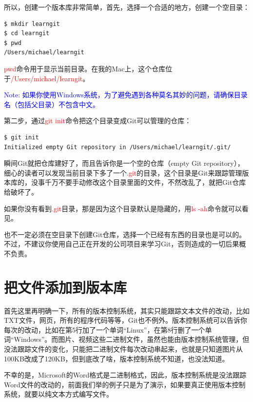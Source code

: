 所以，创建一个版本库非常简单，首先，选择一个合适的地方，创建一个空目录：

\begin{verbatim}
$ mkdir learngit
$ cd learngit
$ pwd
/Users/michael/learngit
\end{verbatim}

\textcolor{red}{pwd}命令用于显示当前目录。在我的Mac上，这个仓库位于\textcolor{red}{/Users/michael/learngit}。

\textcolor{blue}{Note: 如果你使用Windows系统，为了避免遇到各种莫名其妙的问题，请确保目录名（包括父目录）不包含中文。}

第二步，通过\textcolor{red}{git init}命令把这个目录变成Git可以管理的仓库：

\begin{verbatim}
$ git init
Initialized empty Git repository in /Users/michael/learngit/.git/
\end{verbatim}

瞬间Git就把仓库建好了，而且告诉你是一个空的仓库（empty Git repository），细心的读者可以发现当前目录下多了一个\textcolor{red}{.git}的目录，这个目录是Git来跟踪管理版本库的，没事千万不要手动修改这个目录里面的文件，不然改乱了，就把Git仓库给破坏了。

如果你没有看到\textcolor{red}{.git}目录，那是因为这个目录默认是隐藏的，用\textcolor{red}{ls -ah}命令就可以看见。

也不一定必须在空目录下创建Git仓库，选择一个已经有东西的目录也是可以的。不过，不建议你使用自己正在开发的公司项目来学习Git，否则造成的一切后果概不负责。

\section{把文件添加到版本库}

首先这里再明确一下，所有的版本控制系统，其实只能跟踪文本文件的改动，比如TXT文件，网页，所有的程序代码等等，Git也不例外。版本控制系统可以告诉你每次的改动，比如在第5行加了一个单词“Linux”，在第8行删了一个单词“Windows”。而图片、视频这些二进制文件，虽然也能由版本控制系统管理，但没法跟踪文件的变化，只能把二进制文件每次改动串起来，也就是只知道图片从100KB改成了120KB，但到底改了啥，版本控制系统不知道，也没法知道。

不幸的是，Microsoft的Word格式是二进制格式，因此，版本控制系统是没法跟踪Word文件的改动的，前面我们举的例子只是为了演示，如果要真正使用版本控制系统，就要以纯文本方式编写文件。

